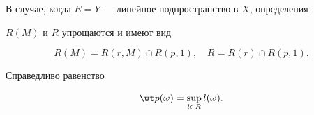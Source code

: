 В случае, когда $E=Y$ --- линейное подпространство в $X$, определения 


$R(M)$ и $R$ упрощаются и имеют вид


\begin{equation} 


R(M)=R(r,M)\cap R(p,1),\quad R=R(r)\cap R(p,1). 


\end{equation} 


 


 


\begin{thms} 


Справедливо равенство


\begin{equation} 


\wt p(\omega)=\sup_{l\in R}l(\omega). 


\end{equation} 


\end{thms} 


 


